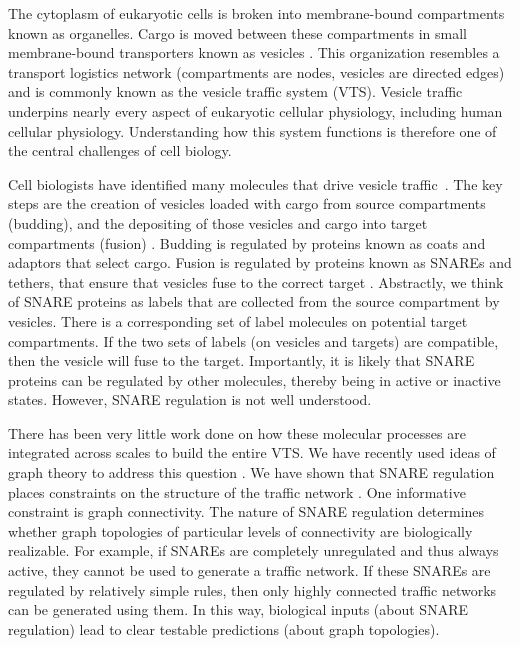 

The cytoplasm of eukaryotic cells is broken into membrane-bound compartments known as organelles. Cargo is moved between these compartments in small membrane-bound transporters known as vesicles \cite{stenmark2009rab}. This organization resembles a transport logistics network (compartments are nodes, vesicles are directed edges) and is commonly known as the vesicle traffic system (VTS). Vesicle traffic underpins nearly every aspect of eukaryotic cellular physiology, including human cellular physiology. Understanding how this system functions is therefore one of the central challenges of cell biology.

Cell biologists have identified many molecules that drive vesicle traffic~\cite{dacks2007evolution}. The key steps are the creation of vesicles loaded with cargo from source compartments (budding), and the depositing of those vesicles and cargo into target compartments (fusion) \cite{munro2004organelle}. Budding is regulated by proteins known as coats and adaptors that select cargo. Fusion is regulated by proteins known as SNAREs and tethers, that ensure that vesicles fuse to the correct target \cite{mani2016stacking}. Abstractly, we think of SNARE proteins as labels that are collected from the source compartment by vesicles. There is a corresponding set of label molecules on potential target compartments. If the two sets of labels (on vesicles and targets) are compatible, then the vesicle will fuse to the target. Importantly, it is likely that SNARE proteins can be regulated by other molecules, thereby being in active or inactive states. However, SNARE regulation is not well understood.

There has been very little work done on how these molecular processes are integrated across scales to build the entire VTS. We have recently used ideas of graph theory to address this question \cite{mani2016stacking}. We have shown that SNARE regulation places constraints on the structure of the traffic network \cite{shukla}. One informative constraint is graph connectivity. The nature of SNARE regulation determines whether graph topologies of particular levels of connectivity are biologically realizable. For example, if SNAREs are completely unregulated and thus always active, they cannot be used to generate a traffic network. If these SNAREs are regulated by relatively simple rules, then only highly connected traffic networks can be generated using them. In this way, biological inputs (about SNARE regulation) lead to clear testable predictions (about graph topologies).

